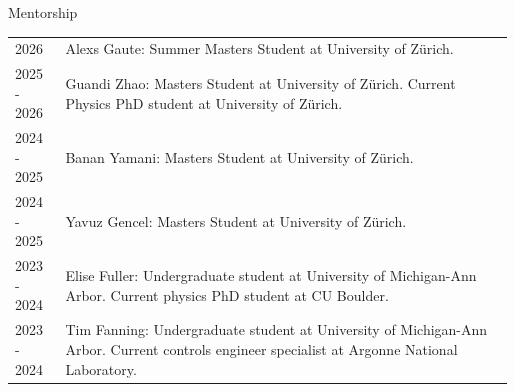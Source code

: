 \begin{rSection}{Mentorship}
\setlength{\extrarowheight}{3pt}
    \begin{longtable}{p{0.1\linewidth}p{0.89\linewidth}}
        2026 & Alexs Gaute: Summer Masters Student at University of Zürich.\\
        2025 - 2026 & Guandi Zhao: Masters Student at University of Zürich. Current Physics PhD student at University of Zürich. \\
        2024 - 2025 & Banan Yamani: Masters Student at University of Zürich. \\
        2024 - 2025 & Yavuz Gencel: Masters Student at University of Zürich. \\
        2023 - 2024 & Elise Fuller: Undergraduate student at University of Michigan-Ann Arbor. Current physics PhD student at CU Boulder.\\
        2023 - 2024 & Tim Fanning: Undergraduate student at University of Michigan-Ann Arbor. Current controls engineer specialist at Argonne National Laboratory.\\
    \end{longtable}
\end{rSection}
